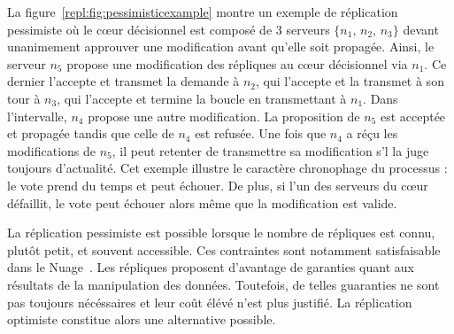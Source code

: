 \begin{figure*}
  \centering
  \hspace{40pt}
  \hspace{10pt}
  \caption{\label{repl:fig:pessimisticexample} Exemple de quorum en réplication
    pessimiste. La modification de $n_5$ est propagée.}
\end{figure*}

La figure~\ref{repl:fig:pessimisticexample} montre un exemple de réplication
pessimiste où le cœur décisionnel est composé de 3 serveurs
$\{n_1,\, n_2,\, n_3\}$ devant unanimement approuver une modification avant
qu'elle soit propagée. Ainsi, le serveur $n_5$ propose une modification des
répliques au cœur décisionnel via $n_1$. Ce dernier l'accepte et transmet la
demande à $n_2$, qui l'accepte et la transmet à son tour à $n_3$, qui l'accepte
et termine la boucle en transmettant à $n_1$.  Dans l'intervalle, $n_4$ propose
une autre modification. La proposition de $n_5$ est acceptée et propagée tandis
que celle de $n_4$ est refusée. Une fois que $n_4$ a réçu les modifications de
$n_5$, il peut retenter de transmettre sa modification s'l la juge toujours
d'actualité. Cet exemple illustre le caractère chronophage du processus : le
vote prend du temps et peut échouer. De plus, si l'un des serveurs du cœur
défaillit, le vote peut échouer alors même que la modification est valide.

La réplication pessimiste est possible lorsque le nombre de répliques est connu,
plutôt petit, et souvent accessible. Ces contraintes sont notamment
satisfaisable dans le Nuage~\cite{mell2011national}. Les répliques proposent
d'avantage de garanties quant aux résultats de la manipulation des
données. Toutefois, de telles guaranties ne sont pas toujours nécéssaires et
leur coût élévé n'est plus justifié. La réplication optimiste constitue alors
une alternative possible.

